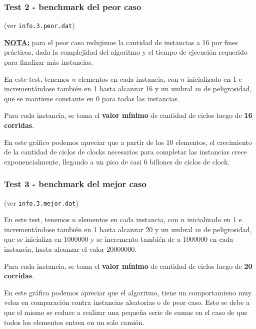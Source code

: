 \newpage
\subsubsection{Test 2 - benchmark del peor caso}

(ver \verb|info.3.peor.dat|) \medskip

\underline{\textbf{NOTA:}} para el peor caso redujimos la cantidad de instancias a 16 por fines prácticos, dada la complejidad
del algoritmo y el tiempo de ejecución requerido para finalizar más instancias. \medskip

En este test, tenemos $n$ elementos en cada instancia, con $n$ inicializado en 1 e incrementándose
también en 1 hasta alcanzar 16 y un umbral $m$ de peligrosidad, que se mantiene constante en 0 para todas las
instancias.

Para cada instancia, se toma el \textbf{valor mínimo} de cantidad de ciclos luego de \textbf{16 corridas}.

\vspace*{0.5cm}


\vspace*{0.5cm}

En este gráfico podemos apreciar que a partir de los 10 elementos, el
crecimiento de la cantidad de ciclos de clocks necesarios para completar las
instancias crece exponencialmente, llegando a un pico de casi 6 billones de
ciclos de clock.


\newpage
\subsubsection{Test 3 - benchmark del mejor caso}

(ver \verb|info.3.mejor.dat|) \medskip

En este test, tenemos $n$ elementos en cada instancia, con $n$ inicializado en 1 e incrementándose
también en 1 hasta alcanzar 20 y un umbral $m$ de peligrosidad, que se inicializa en 1000000 y se incrementa
también de a 1000000 en cada instancia, hasta alcanzar el valor 20000000.

Para cada instancia, se toma el \textbf{valor mínimo} de cantidad de ciclos luego de \textbf{20 corridas}.




En este gráfico podemos apreciar que el algoritmo, tiene un comportamieno
muy veloz en comparación contra instancias aleatorias o de peor caso. Esto
se debe a que el mismo se reduce a realizar una pequeña serie de sumas en el
caso de que todos los elementos entren en un solo camión.
